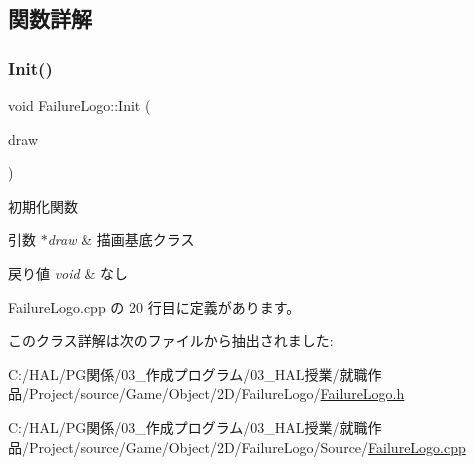 \subsection{関数詳解}
\mbox{\label{class_failure_logo_a22da89def55023f43860cf646da7a74c}} 
\subsubsection{\texorpdfstring{Init()}{Init()}}
{\footnotesize\ttfamily void Failure\+Logo\+::\+Init (\begin{DoxyParamCaption}\item[{\mbox{\hyperlink{class_draw_base}{Draw\+Base}} $\ast$}]{draw }\end{DoxyParamCaption})}



初期化関数 


\begin{DoxyParams}{引数}
{\em $\ast$draw} & 描画基底クラス \\
\hline
\end{DoxyParams}

\begin{DoxyRetVals}{戻り値}
{\em void} & なし \\
\hline
\end{DoxyRetVals}


 Failure\+Logo.\+cpp の 20 行目に定義があります。



このクラス詳解は次のファイルから抽出されました\+:\begin{DoxyCompactItemize}
\item 
C\+:/\+H\+A\+L/\+P\+G関係/03\+\_\+作成プログラム/03\+\_\+\+H\+A\+L授業/就職作品/\+Project/source/\+Game/\+Object/2\+D/\+Failure\+Logo/\mbox{\hyperlink{_failure_logo_8h}{Failure\+Logo.\+h}}\item 
C\+:/\+H\+A\+L/\+P\+G関係/03\+\_\+作成プログラム/03\+\_\+\+H\+A\+L授業/就職作品/\+Project/source/\+Game/\+Object/2\+D/\+Failure\+Logo/\+Source/\mbox{\hyperlink{_failure_logo_8cpp}{Failure\+Logo.\+cpp}}\end{DoxyCompactItemize}
